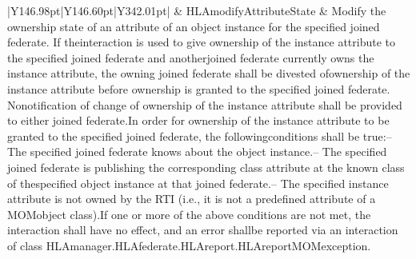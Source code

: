 \begin{landscape}
\begin{momtabletypeset}[8.00]
{{\begin{tabular}{|Y{146.98pt}|Y{146.60pt}|Y{342.01pt}|}
                    & HLAmodifyAttributeState & Modify the ownership state of an attribute of an object instance for the specified joined federate.\allowbreak{} If the\allowbreak{}interaction is used to give ownership of the instance attribute to the specified joined federate and another\allowbreak{}joined federate currently owns the instance attribute, the owning joined federate shall be divested of\allowbreak{}ownership of the instance attribute before ownership is granted to the specified joined federate.\allowbreak{} No\allowbreak{}notification of change of ownership of the instance attribute shall be provided to either joined federate.\allowbreak{}\newline In order for ownership of the instance attribute to be granted to the specified joined federate, the following\allowbreak{}conditions shall be true:\newline -- The specified joined federate knows about the object instance.\allowbreak{}\newline -- The specified joined federate is publishing the corresponding class attribute at the known class of the\allowbreak{}specified object instance at that joined federate.\allowbreak{}\newline -- The specified instance attribute is not owned by the RTI (i.\allowbreak{}e.\allowbreak{}, it is not a predefined attribute of a MOM\allowbreak{}object class).\allowbreak{}\newline If one or more of the above conditions are not met, the interaction shall have no effect, and an error shall\allowbreak{}be reported via an interaction of class HLAmanager.\allowbreak{}HLAfederate.\allowbreak{}HLAreport.\allowbreak{}HLAreportMOMexception.\allowbreak{} \\

\end{tabular}}}
\end{momtabletypeset}
\end{landscape}
